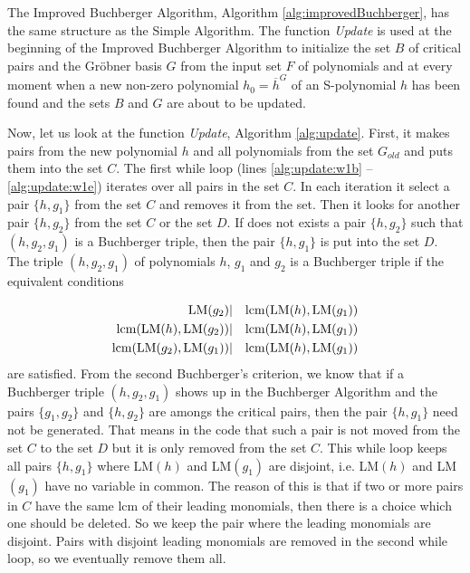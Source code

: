 The Improved Buchberger Algorithm, Algorithm \ref{alg:improvedBuchberger}, has the same structure as the Simple Algorithm. The function \textit{Update} is used at the beginning of the Improved Buchberger Algorithm to initialize the set $B$ of critical pairs and the Gr\"obner basis $G$ from the input set $F$ of polynomials and at every moment when a new non-zero polynomial $h_0 = \overline{h}^G$ of an S-polynomial $h$ has been found and the sets $B$ and $G$ are about to be updated.



Now, let us look at the function \textit{Update}, Algorithm \ref{alg:update}. First, it makes pairs from the new polynomial $h$ and all polynomials from the set $G_{old}$ and puts them into the set $C$. The first while loop (lines \ref{alg:update:w1b} -- \ref{alg:update:w1e}) iterates over all pairs in the set $C$. In each iteration it select a pair $\{h, g_1\}$ from the set $C$ and removes it from the set. Then it looks for another pair $\{h, g_2\}$ from the set $C$ or the set $D$. If does not exists a pair $\{h, g_2\}$ such that $(h, g_2, g_1)$ is a Buchberger triple, then the pair $\{h, g_1\}$ is put into the set $D$. The triple $(h, g_2, g_1)$ of polynomials $h$, $g_1$ and $g_2$ is a Buchberger triple if the equivalent conditions 

\begin{eqnarray}
	\operatorname{LM}(g_2) &|& \operatorname{lcm}(\operatorname{LM}(h), \operatorname{LM}(g_1))\\
	\operatorname{lcm}(\operatorname{LM}(h), \operatorname{LM}(g_2) ) &|& \operatorname{lcm}(\operatorname{LM}(h), \operatorname{LM}(g_1))\\
	\operatorname{lcm}(\operatorname{LM}(g_2), \operatorname{LM}(g_1)) &|& \operatorname{lcm}(\operatorname{LM}(h), \operatorname{LM}(g_1))
\end{eqnarray}
are satisfied. From the second Buchberger's criterion, we know that if a Buchberger triple $(h, g_2, g_1)$ shows up in the Buchberger Algorithm and the pairs $\{g_1, g_2\}$ and $\{h, g_2\}$ are amongs the critical pairs, then the pair $\{h, g_1\}$ need not be generated. That means in the code that such a pair is not moved from the set $C$ to the set $D$ but it is only removed from the set $C$. This while loop keeps all pairs $\{h, g_1\}$ where LM$(h)$ and LM$(g_1)$ are disjoint, i.e. LM$(h)$ and LM$(g_1)$ have no variable in common. The reason of this is that if two or more pairs in $C$ have the same lcm of their leading monomials, then there is a choice which one should be deleted. So we keep the pair where the leading monomials are disjoint. Pairs with disjoint leading monomials are removed in the second while loop, so we eventually remove them all.

